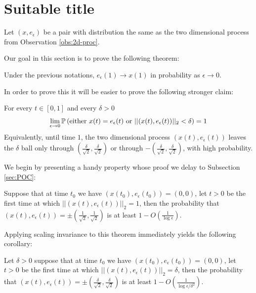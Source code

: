 {
\newcommand{\eeps}{e_\epsilon}

\section{Suitable title}
Let $(x, \eeps)$ be a pair with distribution the same as the two
dimensional process from Observation \ref{obs:2d-proc}.

Our goal in this section is to prove the following theorem:
\begin{theorem}\label{thm:main1}
Under the previous notations, $\eeps(1) \to x(1)$ in probability
as $\epsilon \to 0$.
\end{theorem}

\newcommand{\radiussq}{\delta^2}
\newcommand{\radius}{\delta}
\newcommand{\twonorm}[1]{||#1||_2}

\newcommand{\twodproc}[1]{(x(#1), \eeps(#1))}

In order to prove this it will be easier to prove the following
stronger claim:
\begin{propos}\label{thm:main2}
For every $t\in[0,1]$ and every $\radius>0$
$$\ds \lim_{\epsilon \rightarrow 0}\P\left(\text{either } x(t)=\eeps(t)
\text{ or } \twonorm{\twodproc{t}} <\radius\right)=1$$
Equivalently, until time $1$, the two dimensional process $\twodproc{t}$
leaves the $\radius$ ball only through $(\frac{\radius}{\sqrt2},\frac{\radius}{\sqrt2})$ or through $-(\frac{\radius}{\sqrt2},\frac{\radius}{\sqrt2})$, with high probability.
\end{propos}

We begin by presenting a handy property whose proof
we delay to Subsection \ref{sec:POC}:

\begin{propos}\label{thm:no-escape}
Suppose that at time $t_0$ we have
$\twodproc{t_0}=(0,0)$, let $t>0$ be the first time at which
$\twonorm{\twodproc{t}}=1$, then the probability
that $\twodproc{t} =\pm(\frac{1}{\sqrt2},\frac{1}{\sqrt2})$ is at least $1-O(\frac1{\log\epsilon})$.
\end{propos}

Applying scaling invariance to this theorem immediately yields the
following corollary:
\begin{cor}\label{cor:cor1}
Let $\radius>0$ suppose that at time $t_0$ we have $\twodproc{t_0}=(0,0)$, let
$t>0$ be the first time at which
$\twonorm{\twodproc{t}} = \radius$, then the probability
that $\twodproc{t} =\pm(\frac{\radius}{\sqrt2},\frac{\radius}{\sqrt2})$ is at least
$1-O(\frac{1}{\log\epsilon/\radiussq})$.
\end{cor}

}
